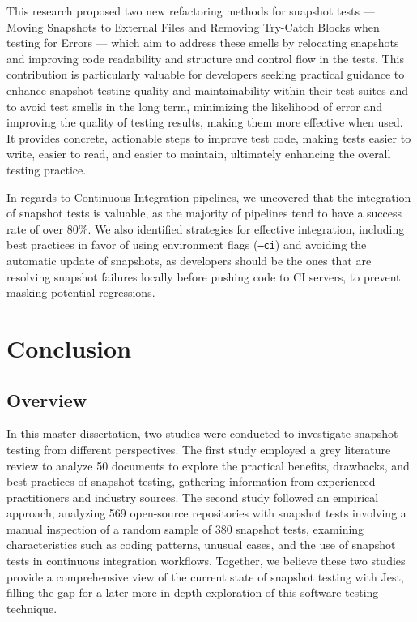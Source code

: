 \documentclass[
	msc, %
	english %
]{../ppgccufmg}
\begin{document}
        This research proposed two new refactoring methods for snapshot tests — Moving Snapshots to External Files and Removing Try-Catch Blocks when testing for Errors — which aim to address these smells by relocating snapshots and improving code readability and structure and control flow in the tests. This contribution is particularly valuable for developers seeking practical guidance to enhance snapshot testing quality and maintainability within their test suites and to avoid test smells in the long term, minimizing the likelihood of error and improving the quality of testing results, making them more effective when used. It provides concrete, actionable steps to improve test code, making tests easier to write, easier to read, and easier to maintain, ultimately enhancing the overall testing practice.
        
        In regards to Continuous Integration pipelines, we uncovered that the integration of snapshot tests is valuable, as the majority of pipelines tend to have a success rate of over 80\%. We also identified strategies for effective integration, including
        best practices in favor of using environment flags (\texttt{--ci}) and avoiding the automatic update of snapshots, as developers should be the ones that are resolving snapshot failures locally before pushing code to CI servers, to prevent masking potential regressions.

     \chapter{Conclusion}
     
		\section{Overview}
  
        In this master dissertation, two studies were conducted to investigate snapshot testing from different perspectives. The first study employed a grey literature review to analyze 50 documents to explore the practical benefits, drawbacks, and best practices of snapshot testing, gathering information from experienced practitioners and industry sources. The second study followed an empirical approach, analyzing 569 open-source repositories with snapshot tests involving a manual inspection of a random sample of 380 snapshot tests, examining characteristics such as coding patterns, unusual cases, and the use of snapshot tests in continuous integration workflows. Together, we believe these two studies provide a comprehensive view of the current state of snapshot testing with Jest, filling the gap for a later more in-depth exploration of this software testing technique.
\end{document}
